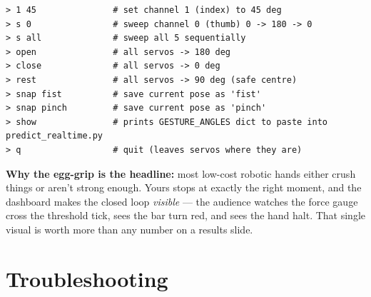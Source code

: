 \documentclass[10pt, a4paper]{article}
\begin{document}
\begin{lstlisting}
> 1 45               # set channel 1 (index) to 45 deg
> s 0                # sweep channel 0 (thumb) 0 -> 180 -> 0
> s all              # sweep all 5 sequentially
> open               # all servos -> 180 deg
> close              # all servos -> 0 deg
> rest               # all servos -> 90 deg (safe centre)
> snap fist          # save current pose as 'fist'
> snap pinch         # save current pose as 'pinch'
> show               # prints GESTURE_ANGLES dict to paste into predict_realtime.py
> q                  # quit (leaves servos where they are)
\end{lstlisting}

\begin{okbox}
\textbf{Why the egg-grip is the headline:} most low-cost robotic hands either crush things or aren't strong enough. Yours stops at exactly the right moment, and the dashboard makes the closed loop \emph{visible} --- the audience watches the force gauge cross the threshold tick, sees the bar turn red, and sees the hand halt. That single visual is worth more than any number on a results slide.
\end{okbox}

\section*{Troubleshooting}
\end{document}
